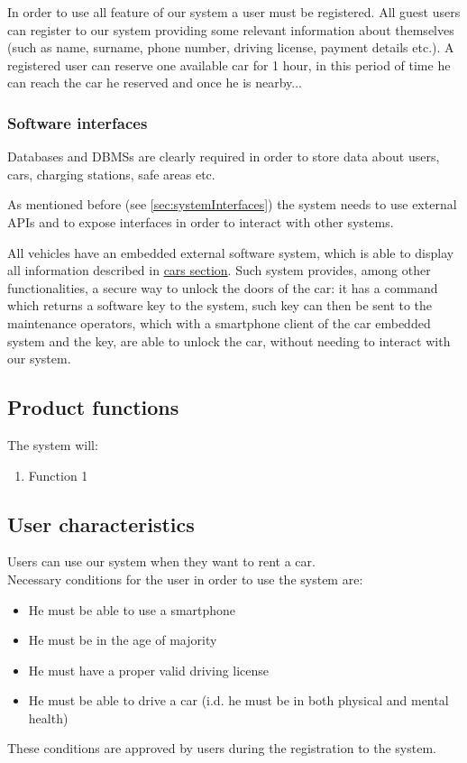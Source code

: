 	In order to use all feature of our system a user must be registered. All guest users can register to our system providing some relevant information about themselves (such as name, surname, phone number, driving license, payment details etc.). A registered user can reserve one available car for 1 hour, in this period of time he can reach the car he reserved and once he is nearby...

\subsubsection{Software interfaces}
Databases and DBMSs are clearly required in order to store data about users, cars, charging stations, safe areas etc.

As mentioned before (see \autoref{sec:systemInterfaces}) the system needs to use external APIs and to expose interfaces in order to interact with other systems.

All vehicles have an embedded external software system, which is able to display all information described in \hyperref[sec:cars]{cars section}. Such system provides, among other functionalities, a secure way to unlock the doors of the car: it has a command which returns a software key to the system, such key can then be sent to the maintenance operators, which with a smartphone client of the car embedded system and the key, are able to unlock the car, without needing to interact with our system.

\subsection{Product functions}
	The system will:
	\begin{enumerate}[label=\textbf{F\arabic*.}]
		\item Function 1
	\end{enumerate}

\subsection{User characteristics}
	Users can use our system when they want to rent a car.\\
	Necessary conditions for the user in order to use the system are:
	\begin{itemize}
		\item He must be able to use a smartphone
		\item He must be in the age of majority
		\item He must have a proper valid driving license
		\item He must be able to drive a car (i.d. he must be in both physical and mental health)
	\end{itemize}
	These conditions are approved by users during the registration to the system.

